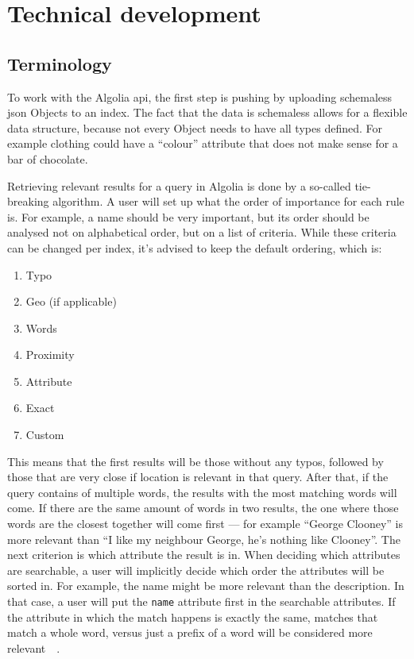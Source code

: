 
\chapter{Technical development} %
\label{chp:execution}

\section{Terminology}
\label{sec:terminology}

To work with the Algolia \acrshort{api}, the first step is pushing by uploading schemaless \acrshort{json} Objects to an \gls{index}. The fact that the data is schemaless allows for a flexible data structure, because not every Object needs to have all types defined. For example clothing could have a ``colour'' attribute that does not make sense for a bar of chocolate.

Retrieving relevant results for a query in Algolia is done by a so-called tie-breaking algorithm. A user will set up what the order of importance for each rule is. For example, a name should be very important, but its order should be analysed not on alphabetical order, but on a list of criteria. While these criteria can be changed per \gls{index}, it's advised to keep the default ordering, which is:

\begin{enumerate}
  \item Typo
  \item Geo (if applicable)
  \item Words
  \item Proximity
  \item Attribute
  \item Exact
  \item Custom
\end{enumerate}

This means that the first results will be those without any typos, followed by those that are very close if location is relevant in that query. After that, if the query contains of multiple words, the results with the most matching words will come. If there are the same amount of words in two results, the one where those words are the closest together will come first --- for example ``George Clooney'' is more relevant than ``I like my neighbour George, he's nothing like Clooney''. The next criterion is which attribute the result is in. When deciding which attributes are searchable, a user will implicitly decide which order the attributes will be sorted in. For example, the name might be more relevant than the description. In that case, a user will put the {\tt name} attribute first in the searchable attributes. If the attribute in which the match happens is exactly the same, matches that match a whole word, versus just a prefix of a word will be considered more relevant~\cite{algolia-relevance}~.

